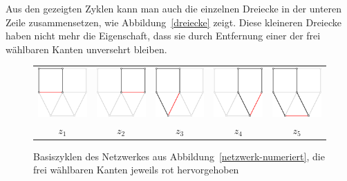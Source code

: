 Aus den gezeigten Zyklen
kann man auch die einzelnen Dreiecke in der unteren Zeile zusammensetzen,
wie Abbildung~\ref{dreiecke} zeigt. Diese kleineren Dreiecke haben nicht
mehr die Eigenschaft, dass sie durch Entfernung einer der frei wählbaren
Kanten unversehrt bleiben.
\begin{figure}
\begin{center}
\begin{tabular}{ccccc}
\includegraphics[width=0.17\hsize]{images/kirchhoff-10}&
\includegraphics[width=0.17\hsize]{images/kirchhoff-6}&
\includegraphics[width=0.17\hsize]{images/kirchhoff-7}&
\includegraphics[width=0.17\hsize]{images/kirchhoff-8}&
\includegraphics[width=0.17\hsize]{images/kirchhoff-9}\\
$z_1$&
$z_2$&
$z_3$&
$z_4$&
$z_5$\\
\end{tabular}
\end{center}
\caption{Basiszyklen des Netzwerkes aus
Abbildung~\ref{netzwerk-numeriert},
die frei wählbaren Kanten jeweils rot hervorgehoben
\label{basiszyklen}}
\end{figure}
